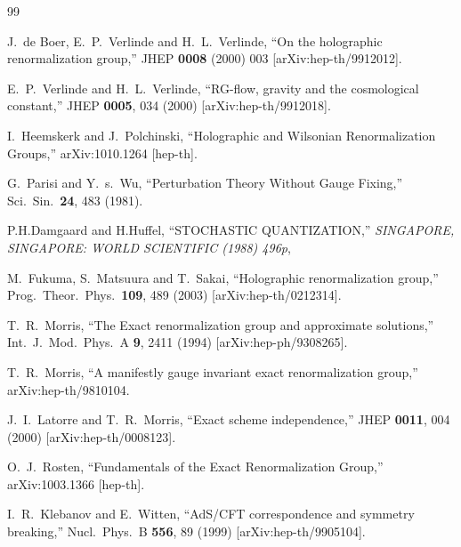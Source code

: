 \documentclass[12pt,epsbox]{article}
\numberwithin{equation}{section}
\begin{document}
\begin{thebibliography}{99}

  J.~de Boer, E.~P.~Verlinde and H.~L.~Verlinde,
  ``On the holographic renormalization group,''
  JHEP {\bf 0008} (2000) 003
  [arXiv:hep-th/9912012].

  E.~P.~Verlinde and H.~L.~Verlinde,
  ``RG-flow, gravity and the cosmological constant,''
  JHEP {\bf 0005}, 034 (2000)
  [arXiv:hep-th/9912018].

  I.~Heemskerk and J.~Polchinski,
  ``Holographic and Wilsonian Renormalization Groups,''
  arXiv:1010.1264 [hep-th].

  G.~Parisi and Y.~s.~Wu,
  ``Perturbation Theory Without Gauge Fixing,''
  Sci.\ Sin.\  {\bf 24}, 483 (1981).

  P.H.Damgaard and H.Huffel,
  ``STOCHASTIC QUANTIZATION,''
{\it  SINGAPORE, SINGAPORE: WORLD SCIENTIFIC (1988) 496p},

  M.~Fukuma, S.~Matsuura and T.~Sakai,
  ``Holographic renormalization group,''
  Prog.\ Theor.\ Phys.\  {\bf 109}, 489 (2003)
  [arXiv:hep-th/0212314].

  T.~R.~Morris,
  ``The Exact renormalization group and approximate solutions,''
  Int.\ J.\ Mod.\ Phys.\  A {\bf 9}, 2411 (1994)
  [arXiv:hep-ph/9308265].

    T.~R.~Morris,
  ``A manifestly gauge invariant exact renormalization group,''
  arXiv:hep-th/9810104.

    J.~I.~Latorre and T.~R.~Morris,
  ``Exact scheme independence,''
  JHEP {\bf 0011}, 004 (2000)
  [arXiv:hep-th/0008123].

  O.~J.~Rosten,
  ``Fundamentals of the Exact Renormalization Group,''
  arXiv:1003.1366 [hep-th].

  I.~R.~Klebanov and E.~Witten,
  ``AdS/CFT correspondence and symmetry breaking,''
  Nucl.\ Phys.\  B {\bf 556}, 89 (1999)
  [arXiv:hep-th/9905104].


\end{thebibliography}
\end{document}
